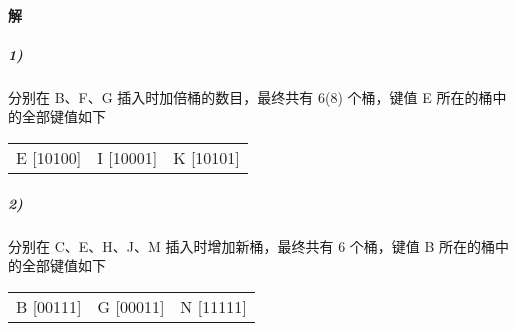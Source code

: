 \documentclass{article}
\begin{document}
\paragraph{解}
\subparagraph{1)} 分别在 B、F、G 插入时加倍桶的数目，最终共有 6(8) 个桶，键值 E 所在的桶中的全部键值如下
\begin{table}[H]
    \centering
    \begin{tabular}{ccc}
        E [10100] & I [10001] & K [10101]
    \end{tabular}
\end{table}
\subparagraph{2)} 分别在 C、E、H、J、M 插入时增加新桶，最终共有 6 个桶，键值 B 所在的桶中的全部键值如下
\begin{table}[H]
    \centering
    \begin{tabular}{ccc}
        B [00111] & G [00011] & N [11111]
    \end{tabular}
\end{table}
\end{document}
